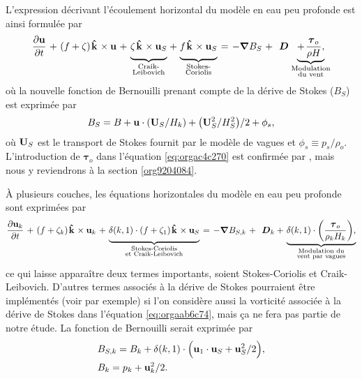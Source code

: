 \documentclass[10pt]{report}
\numberwithin{equation}{section}
\newcommand{\kvf}{\vb{\hat{k}}}
\newcommand{\uu}{\vb{u}}
\newcommand{\tall}{\vphantom{pA^{x^x}_p}}
\newcommand{\grande}{\vphantom{\frac{1}{xx}}}
\newcommand{\pt}{\hspace{1pt}} %
\begin{document}
L'expression décrivant l'écoulement horizontal du modèle en eau peu profonde est ainsi formulée par
\begin{equation}
\label{eq:orgac4c270}
   \pdv{\uu}{t}
   \pt + \pt \qty(f+\zeta)\pt \kvf\pt \times \uu
   \pt + \pt \underbrace{\grande\zeta\pt \kvf\pt \times \uu_S}_{\substack{\text{Craik-}\\ \text{Leibovich}}}
   \pt + \pt \underbrace{\grande f\pt \kvf\pt \times \uu_S  }_{\substack{\text{Stokes-}\\ \text{Coriolis}}}
   \pt = \pt -\gradient{B_S}
   \pt + \pt \ \boldsymbol{D}
    \pt \underbrace{+\pt\frac{\boldsymbol{\tau}_o}{\rho H},}_{\substack{\text{Modulation}\\ \text{du vent}}}
\end{equation}
où la nouvelle fonction de Bernouilli prenant compte de la dérive de Stokes (\(B_S\)) est exprimée par
\begin{align}
   B_S = B + \uu\cdot\qty(\vb{U}_S/H_k) + \qty(\vb{U}_S^2/H_S^2)/2 + \phi_s,
\end{align}
où \(\vb{U}_S\) est le transport de Stokes fournit par le modèle de vagues et \(\phi_s\equiv p_s/\rho_o\).
L'introduction de \(\boldsymbol{\tau}_o\) dans l'équation \ref{eq:orgac4c270} est confirmée par \Textcite{breivik_al_2015}, mais nous y reviendrons à la section \ref{org9204084}.
\bigskip

À plusieurs couches, les équations horizontales du modèle en eau peu profonde sont exprimées par
\begin{equation}
\label{eq:orgaab6c74}
   \pdv{\uu_k}{t}
   \pt + \pt \qty(f+\zeta_k)\pt \kvf\pt \times \uu_k
   \pt + \pt \underbrace{\delta(k,1)\cdot\grande\qty(f + \zeta_1)\pt \kvf\pt \times \uu_S}_{\substack{\text{Stokes-Coriolis}\\ \text{et Craik-Leibovich}}}
   \pt = \pt -\gradient{B_{S,k}}
   \pt + \pt \ \boldsymbol{D}_k
   +\pt \underbrace{\delta(k,1)\cdot\qty(\frac{\boldsymbol{\tau}_o}{\rho_k H_k}),}_{\substack{\text{Modulation du}\\ \text{vent par vagues}}}
\end{equation}
ce qui laisse apparaître deux termes importants, soient Stokes-Coriolis et Craik-Leibovich.
D'autres termes associés à la dérive de Stokes pourraient être implémentés (voir \Textcite{wu_breivik_2019} par exemple) si l'on considère aussi la vorticité associée à la dérive de Stokes dans l'équation \ref{eq:orgaab6c74}, mais ça ne fera pas partie de notre étude.
La fonction de Bernouilli serait exprimée par
\begin{align}
   & B_{S,k} = B_k + \delta(k,1)\cdot\qty(\tall\uu_1\cdot\vb{u}_S + \vb{u}_S^2/2), \\
   & B_k = p_k + \vb{u}_k^2/2.
\end{align}
\end{document}
